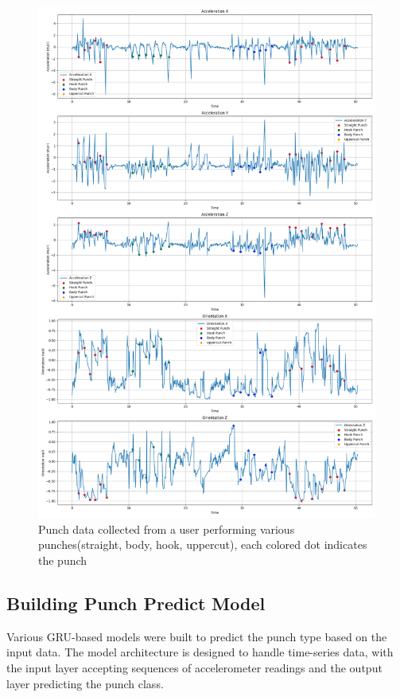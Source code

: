 \documentclass{article}
\begin{document}
    \begin{figure}[ht]
        \centering
        \includegraphics[width=\textwidth]{punch_data.png}
        \caption{Punch data collected from a user performing various punches(straight,
        body, hook, uppercut), each colored dot indicates the punch}
        \label{fig:punch_data}
    \end{figure}

    \FloatBarrier
    \subsection{Building Punch Predict Model}

    Various GRU-based models were built to predict the punch type based on the
    input data. The model architecture is designed to handle time-series data,
    with the input layer accepting sequences of accelerometer readings and the
    output layer predicting the punch class.
\end{document}
